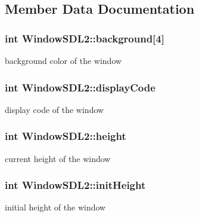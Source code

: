 \subsection{Member Data Documentation}
\subsubsection[{\texorpdfstring{background}{background}}]{\setlength{\rightskip}{0pt plus 5cm}int Window\+S\+D\+L2\+::background\mbox{[}4\mbox{]}}\hypertarget{structWindowSDL2_a1d9cde91afa4d6b0034ba8e15d36bcbe}{}\label{structWindowSDL2_a1d9cde91afa4d6b0034ba8e15d36bcbe}
background color of the window 
\subsubsection[{\texorpdfstring{display\+Code}{displayCode}}]{\setlength{\rightskip}{0pt plus 5cm}int Window\+S\+D\+L2\+::display\+Code}\hypertarget{structWindowSDL2_ad228c3ac40ae482b85280e3c7d9c3375}{}\label{structWindowSDL2_ad228c3ac40ae482b85280e3c7d9c3375}
display code of the window 
\subsubsection[{\texorpdfstring{height}{height}}]{\setlength{\rightskip}{0pt plus 5cm}int Window\+S\+D\+L2\+::height}\hypertarget{structWindowSDL2_a6a3ca624143f2bf9852cb623d302c56d}{}\label{structWindowSDL2_a6a3ca624143f2bf9852cb623d302c56d}
current height of the window 
\subsubsection[{\texorpdfstring{init\+Height}{initHeight}}]{\setlength{\rightskip}{0pt plus 5cm}int Window\+S\+D\+L2\+::init\+Height}\hypertarget{structWindowSDL2_ad18f000e45db56098bd8c2ea87e75019}{}\label{structWindowSDL2_ad18f000e45db56098bd8c2ea87e75019}
initial height of the window 
